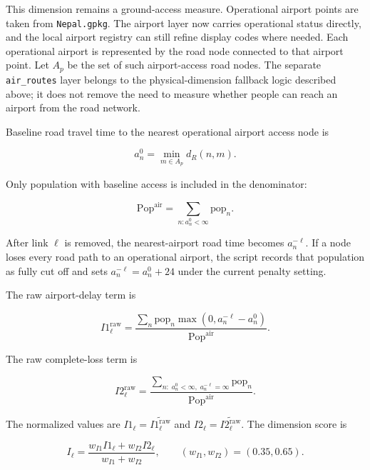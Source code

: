 \documentclass[11pt,a4paper]{article}
\begin{document}
This dimension remains a ground-access measure. Operational airport points are
taken from \texttt{Nepal.gpkg}. The airport layer now carries operational status
directly, and the local airport registry can still refine display codes where
needed. Each operational airport is represented by the road node connected to
that airport point. Let $A_p$ be the set of such airport-access road nodes.
The separate \texttt{air\_routes} layer belongs to the physical-dimension
fallback logic described above; it does not remove the need to measure whether
people can reach an airport from the road network.

Baseline road travel time to the nearest operational airport access node is

\begin{equation}
a^0_n=\min_{m\in A_p} d_R(n,m).
\label{eq:mlpi-airport-base}
\end{equation}

Only population with baseline access is included in the denominator:

\begin{equation}
\mathrm{Pop}^{\mathrm{air}}=
\sum_{n:a^0_n<\infty}\mathrm{pop}_n.
\label{eq:mlpi-air-pop}
\end{equation}

After link $\ell$ is removed, the nearest-airport road time becomes
$a^{-\ell}_n$. If a node loses every road path to an operational airport, the
script records that population as fully cut off and sets
$a^{-\ell}_n=a^0_n+24$ under the current penalty setting.

The raw airport-delay term is

\begin{equation}
I1^{\mathrm{raw}}_{\ell}
=
\frac{
\sum_n \mathrm{pop}_n \max(0,a^{-\ell}_n-a^0_n)
}{
\mathrm{Pop}^{\mathrm{air}}
}.
\label{eq:mlpi-i1-raw}
\end{equation}

The raw complete-loss term is

\begin{equation}
I2^{\mathrm{raw}}_{\ell}
=
\frac{
\sum_{n:\;a^0_n<\infty,\;a^{-\ell}_n=\infty}
\mathrm{pop}_n
}{
\mathrm{Pop}^{\mathrm{air}}
}.
\label{eq:mlpi-i2-raw}
\end{equation}

The normalized values are $I1_{\ell}=\widetilde{I1^{\mathrm{raw}}_{\ell}}$
and $I2_{\ell}=\widetilde{I2^{\mathrm{raw}}_{\ell}}$. The dimension score is

\begin{equation}
I_{\ell}
=\frac{w_{I1}I1_{\ell}+w_{I2}I2_{\ell}}
        {w_{I1}+w_{I2}},
\qquad
(w_{I1},w_{I2})=(0.35,0.65).
\label{eq:mlpi-interconnected}
\end{equation}
\end{document}
